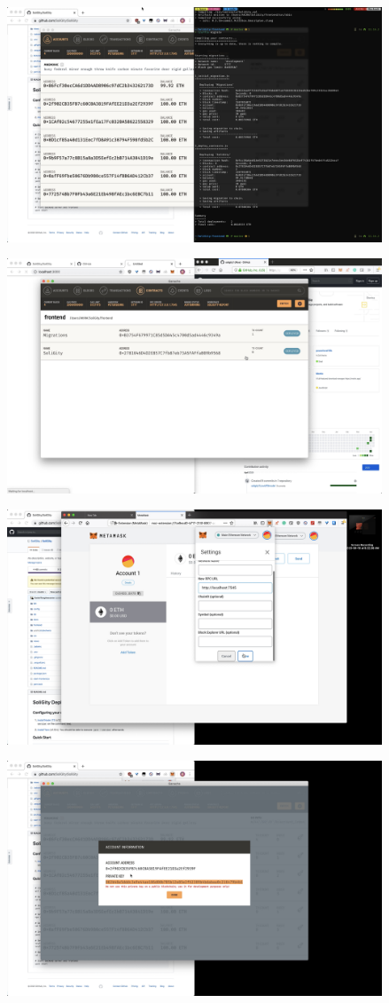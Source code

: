 \documentclass[12pt]{article}
\renewcommand{\_}{\kern-1.5pt\textunderscore\kern-1.5pt}
\begin{document}
\includegraphics[height=7cm]{graphs/07. truffle_migrate}

\includegraphics[height=7cm]{graphs/08. ganache_deployed_contract}

\includegraphics[height=7cm]{graphs/09. metamask_setup_network}

\includegraphics[height=7cm]{graphs/10. metamask_setup_bob}
\end{document}
